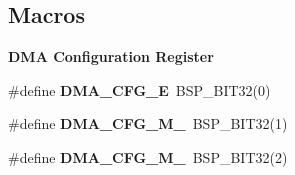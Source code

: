 \subsection*{Macros}
\begin{Indent}\textbf{ D\+MA Configuration Register}\par
\begin{DoxyCompactItemize}
\item 
\#define {\bfseries D\+M\+A\+\_\+\+C\+F\+G\+\_\+E}~B\+S\+P\+\_\+\+B\+I\+T32(0)
\item 
\#define {\bfseries D\+M\+A\+\_\+\+C\+F\+G\+\_\+\+M\+\_}~B\+S\+P\+\_\+\+B\+I\+T32(1)
\item 
\#define {\bfseries D\+M\+A\+\_\+\+C\+F\+G\+\_\+\+M\+\_}~B\+S\+P\+\_\+\+B\+I\+T32(2)
\end{DoxyCompactItemize}
\end{Indent}
